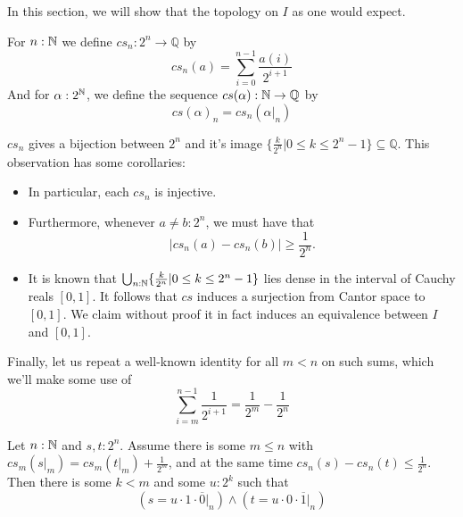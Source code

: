 In this section, we will show that the topology on $I$ as one would expect. 

\begin{definition}
  For $n:\mathbb{N}$ we define 
  $cs_n:2^n \to \mathbb Q$ by 
  \begin{equation}
    cs_n(a) = \sum\limits_{i=0}^{n-1} \frac{a(i)} {2^{i+1}}
  \end{equation}
  And for $\alpha:2^{\mathbb{N}}$, we define the sequence $cs(\alpha) : \mathbb{N} \to \mathbb Q$ by 
  \begin{equation}
    cs(\alpha)_n = cs_n(\alpha|_n)
  \end{equation}
\end{definition}
\begin{remark}\label{rmkPropertiesCSn}
  $cs_n$ gives a bijection between $2^n$ and it's image 
  $\{\frac{k}{2^n}|0\leq k \leq 2^{n}-1\}\subseteq \mathbb Q$.
  This observation has some corollaries: 
  \begin{itemize}
    \item In particular, each $cs_n$ is injective. 
    \item Furthermore, whenever $a\neq b:2^n$, we must have that 
      \begin{equation} 
        |cs_n(a)-cs_n(b)|\geq \frac{1}{2^n}.
      \end{equation}
    \item It is known that $\bigcup_{n:\mathbb{N}} \{\frac{k}{2^n}|0\leq k \leq 2^{n}-1\}$ 
      lies dense in the interval of Cauchy reals $[0,1]$. 
      It follows that $cs$ induces a surjection from Cantor space to $[0,1]$. %
      We claim without proof it in fact induces an equivalence between $I$ and $[0,1]$.
  \end{itemize}
  Finally, let us repeat a well-known identity for all $m<n$ on such sums, which we'll make some use of 
  \begin{equation}
   \sum\limits_{i = m}^{n-1} \frac{1}{2^{i+1}} = \frac{1}{2^{m}} - \frac{1}{2^n}
  \end{equation}
\end{remark}
\begin{lemma}\label{CauchyApproxLemma}
  Let $n:\mathbb{N}$ and  $s,t:2^n$. Assume there is some $ m \leq n$ with $cs_m(s|_m) = cs_m(t|_m) + \frac{1}{2^m}$, and 
  at the same time $cs_n(s) -cs_n(t)\leq \frac{1}{2^n}$. 
  Then there is some $k< m$ and some $u:2^k$ such that 
  \begin{equation}
    (s = u \cdot 1 \cdot \overline 0|_n)
    \wedge 
    (t = u \cdot 0 \cdot \overline 1|_n)
  \end{equation}
\end{lemma}
